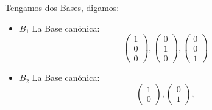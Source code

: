 \documentclass[12pt]{report}                                    %
\begin{document}
            Tengamos dos Bases, digamos:
            \begin{itemize}
                \item $B_1$ La Base canónica:
                    \begin{equation*}
                        \begin{pmatrix} 1\\0\\0\end{pmatrix}, 
                        \begin{pmatrix} 0\\1\\0\end{pmatrix}, 
                        \begin{pmatrix} 0\\0\\1\end{pmatrix}
                    \end{equation*}

                \item $B_2$ La Base canónica:
                    \begin{equation*}
                        \begin{pmatrix} 1\\0\end{pmatrix}, 
                        \begin{pmatrix} 0\\1\end{pmatrix}, 
                    \end{equation*}
            \end{itemize}
\end{document}
